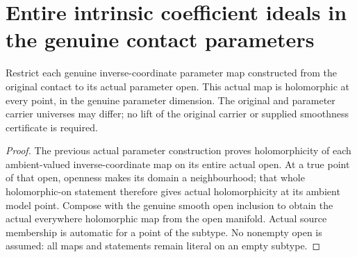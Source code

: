 \section{Entire intrinsic coefficient ideals in the genuine contact parameters}

\begin{lemma}
\label{hir:submersion-contact-param-coeff-actual-open-maps}
\leanok
Restrict each genuine inverse-coordinate parameter map constructed from the
original contact to its actual parameter open. This actual map is holomorphic
at every point, in the genuine parameter dimension. The original and
parameter carrier universes may
differ; no lift of the original carrier or supplied smoothness certificate
is required.
\end{lemma}
\begin{proof}
The previous actual parameter construction proves holomorphicity of each
ambient-valued inverse-coordinate map on its entire actual open. At a true
point of that open, openness makes its domain a neighbourhood; that whole
holomorphic-on statement therefore gives actual holomorphicity at its ambient
model point. Compose with the genuine smooth open inclusion to obtain the
actual everywhere holomorphic map from the open manifold. Actual source
membership is automatic for a point of the subtype.  No nonempty open is assumed: all maps and statements remain
literal on an empty subtype.
\end{proof}

